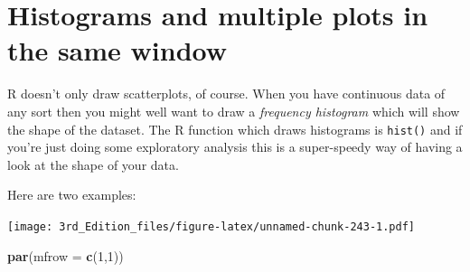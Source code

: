 \documentclass[
]{book}
\newenvironment{Shaded}{\begin{snugshade}}{\end{snugshade}}
\newcommand{\DataTypeTok}[1]{\textcolor[rgb]{0.13,0.29,0.53}{#1}}
\newcommand{\DecValTok}[1]{\textcolor[rgb]{0.00,0.00,0.81}{#1}}
\newcommand{\KeywordTok}[1]{\textcolor[rgb]{0.13,0.29,0.53}{\textbf{#1}}}
\newcommand{\NormalTok}[1]{#1}
\newcommand{\OperatorTok}[1]{\textcolor[rgb]{0.81,0.36,0.00}{\textbf{#1}}}
\newcommand{\StringTok}[1]{\textcolor[rgb]{0.31,0.60,0.02}{#1}}
\begin{document}
\hypertarget{histograms-and-multiple-plots-in-the-same-window}{%
\section{Histograms and multiple plots in the same window}\label{histograms-and-multiple-plots-in-the-same-window}}

R doesn't only draw scatterplots, of course. When you have continuous data of any sort then you might well want to draw a \emph{frequency histogram} which will show the shape of the dataset. The R function which draws histograms is \texttt{hist()} and if you're just doing some exploratory analysis this is a super-speedy way of having a look at the shape of your data.

Here are two examples:

\begin{Shaded}
\end{Shaded}

\texttt{[image: 3rd\_Edition\_files/figure-latex/unnamed-chunk-243-1.pdf]}

\begin{Shaded}
\begin{Highlighting}[]

\KeywordTok{par}\NormalTok{(}\DataTypeTok{mfrow =} \KeywordTok{c}\NormalTok{(}\DecValTok{1}\NormalTok{,}\DecValTok{1}\NormalTok{))}
\end{Highlighting}
\end{Shaded}
\end{document}
